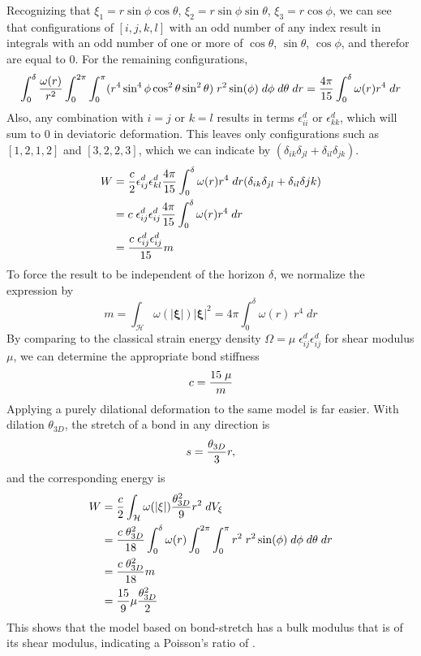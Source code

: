 %
Recognizing that $\xi_1 = r \sin\phi\cos\theta$, $\xi_2=r\sin\phi\sin\theta$, $\xi_3=r\cos\phi$, we can see that configurations of $[i,j,k,l]$ with an odd number of any index result in integrals with an odd number of one or more of $\cos\theta$, $\sin\theta$, $\cos\phi$, and therefor are equal to 0. 
For the remaining configurations,
%
\begin{equation}
\int_0^\delta \frac{\omega(r)}{r^2}\int_0^{2\pi}\int_0^\pi (r^4 \sin^4 \phi \cos^2\theta\sin^2\theta)\;r^2 \sin(\phi)\;d\phi\;d\theta\;dr =  \frac{4\pi}{15} \int_0^\delta \omega(r)r^4\;dr\notag
\end{equation}
%
Also, any combination with $i=j$ or $k=l$ results in terms $\epsilon_{ii}^d$ or  $\epsilon_{kk}^d$, which will sum to 0 in deviatoric deformation. 
This leaves only configurations such as $[1,2,1,2]$ and $[3,2,2,3]$, which we can indicate by $(\delta_{ik}\delta_{jl}+\delta_{il}\delta_{jk})$.
%
\begin{align}
W&= \frac{c}{2}\epsilon_{ij}^d \epsilon_{kl}^d \frac{4\pi}{15} \int_0^\delta \omega(r)r^4\;dr (\delta_{ik}\delta_{jl}+\delta_{il}\delta{jk})\notag\\
&= c \;\epsilon_{ij}^d\epsilon_{ij}^d \frac{4\pi}{15} \int_0^\delta \omega(r)r^4\;dr \notag\\
&= \frac{c\; \epsilon_{ij}^d\epsilon_{ij}^d }{15}m\notag
\end{align}
%
To force the result to be independent of the horizon $\delta$, we normalize the expression by
%
\begin{equation}
\label{eq:weighted}
m=\int_\mathcal{H}\omega(|\boldsymbol{\xi}|)|\boldsymbol{\xi}|^2 = 4\pi \int_0^\delta \omega(r)\;r^4\;dr
\end{equation}
%
By comparing to the classical strain energy density $\Omega = \mu\;\epsilon_{ij}^d\epsilon_{ij}^d$ for shear modulus $\mu$, we can determine the appropriate bond stiffness
%
\begin{equation}
c = \frac{15\;\mu}{m}\notag
\end{equation}
%
Applying a purely dilational deformation to the same model is far easier.
With dilation $\theta_{3D}$, the stretch of a bond in any direction is
%
\begin{equation}
s = \frac{\theta_{3D}}{3} r,\notag
\end{equation}
%
and the corresponding energy is 
%
\begin{align}
W &= \frac{c}{2}\int_\mathcal{H} \omega(|\xi|)\frac{\theta^2_{3D}}{9} r^2 \;dV_\xi\notag\\
&=\frac{c\;\theta^2_{3D}}{18} \int_0^\delta \omega(r)\int_0^{2\pi}\int_0^\pi r^2\;r^2 \sin(\phi)\;d\phi\;d\theta\;dr \notag\\
&= \frac{c\;\theta^2_{3D}}{18} m \notag\\
&= \frac{15}{9}\mu\frac{\theta^2_{3D}}{2}
\end{align}
%
This shows that the model based on bond-stretch has a bulk modulus that is  of its shear modulus, indicating a Poisson's ratio of .

